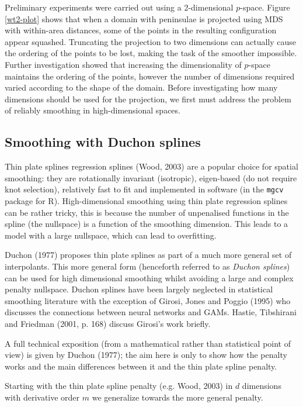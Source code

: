 \documentclass[useAMS, referee]{biom}
\begin{document}
Preliminary experiments were carried out using a 2-dimensional $p$-space. Figure \ref{wt2-plot} shows that when a domain with peninsulae is projected using MDS with within-area distances, some of the points in the resulting configuration appear squashed. Truncating the projection to two dimensions can actually cause the ordering of the points to be lost, making the task of the smoother impossible. Further investigation showed that increasing the dimensionality of $p$-space maintains the ordering of the points, however the number of dimensions required varied according to the shape of the domain. Before investigating how many dimensions should be used for the projection, we first must address the problem of reliably smoothing in high-dimensional spaces.

\subsection{Smoothing with Duchon splines}
\label{ss:duchon}

Thin plate splines regression splines (Wood, 2003) are a popular choice for spatial smoothing: they are rotationally invariant (isotropic), eigen-based (do not require knot selection), relatively fast to fit and implemented in software (in the \texttt{mgcv} package for \textsf{R}). High-dimensional smoothing using thin plate regression splines can be rather tricky, this is because the number of unpenalised functions in the spline (the nullspace) is a function of the smoothing dimension. This leads to a model with a large nullspace, which can lead to overfitting.

Duchon (1977) proposes thin plate splines as part of a much more general set of interpolants. This more general form (henceforth referred to as \textit{Duchon splines}) can be used for high dimensional smoothing whilst avoiding a large and complex penalty nullspace. Duchon splines have been largely neglected in statistical smoothing literature with the exception of Girosi, Jones and Poggio (1995) who discusses the connections between neural networks and GAMs. Hastie, Tibshirani and Friedman (2001, p. 168) discuss Girosi's work briefly.

A full technical exposition (from a mathematical rather than statistical point of view) is given by Duchon (1977); the aim here is only to show how the penalty works and the main differences between it and the thin plate spline penalty. 

Starting with the thin plate spline penalty (e.g. Wood, 2003) in $d$ dimensions with derivative order $m$ we generalize towards the more general penalty.
\end{document}
